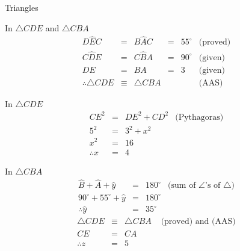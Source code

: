 \begin{wex}{Triangles}
{In $\triangle CDE$ and $\triangle CBA$
\begin{equation*}
 \begin{array}{rcclll}
D\hat{E}C &=& B\hat{A}C &=& 55^{\circ}  & \mbox{(proved)} \\
C\hat{D}E &=& C\hat{B}A &=& 90^{\circ}  & \mbox{(given)} \\
DE &=& BA &=& 3  & \mbox{(given)} \\
\therefore \triangle{CDE} &\equiv& \triangle {CBA} &&& \mbox{(AAS)} 
 \end{array}
\end{equation*}

In $\triangle CDE$
\begin{equation*}
 \begin{array}{rcll}

CE^{2} &=& DE^{2} + CD^{2} & \mbox{(Pythagoras)} \\
5^{2} &=& 3^{2} + x^{2} &  \\
x^{2} &=& 16 & \\
\therefore x &=& 4 & 
 \end{array}
\end{equation*}

In $\triangle CBA$
\begin{equation*}
 \begin{array}{rcll}
\hat{B} + \hat{A} + \hat{y} &=& 180^{\circ}  & \mbox{(sum of $\angle$'s of $\triangle$)} \\
90^{\circ} + 55^{\circ} + \hat{y} &=& 180^{\circ}  & \\
\therefore \hat{y} &=& 35^{\circ} & 
 \end{array}
\end{equation*}
\begin{equation*}
 \begin{array}{rcll}
\triangle CDE &\equiv& \triangle CBA &\mbox{ (proved) and (AAS)} \\
 CE &=& CA  & \\
 \therefore z &=& 5 & 
 \end{array}
\end{equation*}

}
\end{wex}
% 
% 
%    
